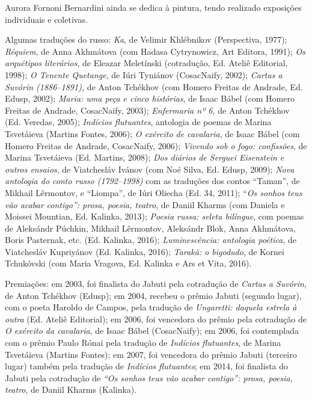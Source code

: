 Aurora Fornoni Bernardini ainda se dedica à pintura, tendo realizado
exposições individuais e coletivas.

Algumas traduções do russo: \emph{Ka}, de Velimir Khlébnikov
(Perspectiva, 1977); \emph{Réquiem}, de Anna Akhmátova (com Hadasa
Cytrynowicz, Art Editora, 1991); \emph{Os arquétipos literários}, de
Eleazar Meletínski (cotradução, Ed. Ateliê Editorial, 1998); \emph{O
Tenente Quetange}, de Iúri Tyniánov (CosacNaify, 2002); \emph{Cartas a
Suvórin (1886--1891),} de Anton Tchékhov (com Homero Freitas de Andrade,
Ed. Edusp, 2002); \emph{Maria: uma peça e cinco histórias}, de Isaac
Bábel (com Homero Freitas de Andrade, CosacNaify, 2003);
\emph{Enfermaria nº 6,} de Anton Tchékhov (Ed. Veredas, 2005);
\emph{Indícios flutuantes}, antologia de poemas de Marina Tsvetáieva
(Martins Fontes, 2006); \emph{O exército de cavalaria}, de Isaac Bábel
(com Homero Freitas de Andrade, CosacNaify, 2006); \emph{Vivendo sob o
fogo: confissões}, de Marina Tsvetáieva (Ed. Martins, 2008); \emph{Dos
diários de Serguei Eisenstein e outros ensaios}, de Viatchesláv Ivánov
(com Noé Silva, Ed. Edusp, 2009); \emph{Nova antologia do conto russo
(1792--1998)} com as traduções dos contos ``Taman'', de Mikhail
Lêrmontov, e ``Liompa'', de Iúri Oliecha (Ed. 34, 2011); ``\emph{Os
sonhos teus vão acabar contigo'': prosa, poesia, teatro}, de Daniil
Kharms (com Daniela e Moissei Mountian, Ed. Kalinka, 2013); \emph{Poesia
russa: seleta bilíngue}, com poemas de Aleksándr Púchkin, Mikhail
Lêrmontov, Aleksándr Blok, Anna Akhmátova, Boris Pasternak, etc. (Ed.
Kalinka, 2016); \emph{Luminescência: antologia poética}, de Viatchesláv
Kupriyánov (Ed. Kalinka, 2016); \emph{Tarakã: o bigodudo}, de Kornei
Tchukóvski (com Maria Vragova, Ed. Kalinka e Ars et Vita, 2016).

Premiações: em 2003, foi finalista do Jabuti pela cotradução de
\emph{Cartas a Suvórin}, de Anton Tchékhov (Edusp); em 2004, recebeu o
prêmio Jabuti (segundo lugar), com o poeta Haroldo de Campos, pela
tradução de \emph{Ungaretti: daquela estrela à outra} (Ed. Ateliê
Editorial); em 2006, foi vencedora do prêmio  pela cotradução de
\emph{O exército da cavalaria}, de Isaac Bábel (CosacNaify); em 2006,
foi contemplada com o prêmio Paulo Rónai pela tradução de \emph{Indícios
flutuantes}, de Marina Tsvetáieva (Martins Fontes); em 2007, foi
vencedora do prêmio Jabuti (terceiro lugar) também pela tradução de
\emph{Indícios flutuantes}; em 2014, foi finalista do Jabuti pela
cotradução de \emph{``Os sonhos teus vão acabar contigo'': prosa,
poesia, teatro}, de Daniil Kharms (Kalinka).

